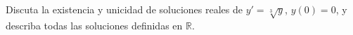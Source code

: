 Discuta la existencia y unicidad de soluciones reales de $y'=\sqrt[3]{y}$, $y(0)=0$, y describa todas las soluciones definidas en $\mathbb R$.
